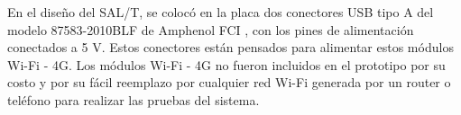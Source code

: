 En el diseño del SAL/T, se colocó en la placa dos conectores USB tipo A del modelo 87583-2010BLF de Amphenol FCI \cite{87583-2010BLF}, con los pines de alimentación conectados a 5 V. Estos conectores están pensados para alimentar estos módulos Wi-Fi - 4G. Los módulos Wi-Fi - 4G no fueron incluidos en el prototipo por su costo y por su fácil reemplazo por cualquier red Wi-Fi generada por un router o teléfono para realizar las pruebas del sistema. 
